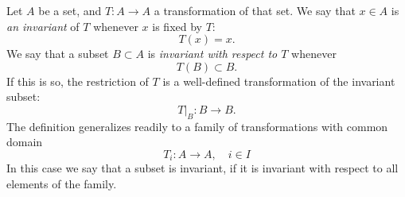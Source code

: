 \documentclass[12pt]{article}
\begin{document}
Let $A$ be a set, and   $T:A\rightarrow A$  a transformation of that
set.  We say that $x\in A$ is {\em an invariant} of $T$ whenever $x$ is
fixed by $T$:
$$T(x)=x.$$
We say that a subset $B\subset A$ is
{\em invariant with respect to $T$} whenever
$$T(B)\subset B.$$ If this is so, the restriction of $T$ 
is a well-defined transformation of the invariant subset:
$$T\Big|_B : B\rightarrow B.$$
The definition generalizes readily to a family of transformations with
common domain
$$T_i : A\rightarrow A,\quad i\in I$$
In this case we say that a subset is invariant, if it is invariant
with respect to all elements of the family.
\end{document}
